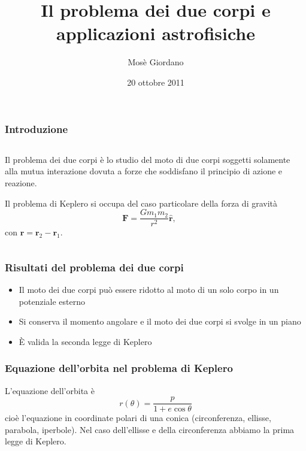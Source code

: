 \documentclass[10pt]{beamer}
\author{Mosè Giordano}
\title{Il problema dei due corpi e applicazioni astrofisiche}
\institute[UniSalento]{Università del Salento}
\date{20 ottobre 2011}
\newcommand*{\versor}[1]{\hat{\bm{#1}}}
\begin{document}
\titlepageframe{}

\begin{frame}
  \frametitle{Introduzione}
  \begin{columns}
    \begin{column}{0.5\columnwidth}
      Il \alert{problema dei due corpi} è lo studio del moto di due corpi
      soggetti solamente alla mutua interazione dovuta a forze che soddisfano il
      principio di azione e reazione.

      Il \alert{problema di Keplero} si occupa del caso particolare della forza
      di gravità
      \begin{equation*}
        \bm{F} = \frac{Gm_{1} m_{2}}{r^{2}}\versor{r},
      \end{equation*}
      con $\bm{r} = \bm{r}_{2} - \bm{r}_{1}.$
    \end{column}
    \begin{column}{0.4\columnwidth}
      \begin{tikzpicture}[tdplot_main_coords,scale=3,font=\footnotesize]
        
      \end{tikzpicture}
    \end{column}
  \end{columns}
\end{frame}

\begin{frame}
  \frametitle{Risultati del problema dei due corpi}
  \begin{itemize}[<+->]
  \item Il moto dei due corpi può essere ridotto al
    \alert{moto di un solo corpo} in un potenziale esterno
  \item Si \alert{conserva il momento angolare} e il moto dei due corpi si
    svolge in un \alert{piano} \\
    \centering
    \begin{tikzpicture}[tdplot_main_coords,scale=2.5,font=\scriptsize]
      
    \end{tikzpicture}
  \item È valida la \alert{seconda legge di Keplero}
  \end{itemize}
\end{frame}

\begin{frame}
  \frametitle{Equazione dell'orbita nel problema di Keplero}
  L'equazione dell'orbita è
  \begin{equation*}
    r(\theta) = \frac{p}{1 + e \cos\theta}
  \end{equation*}
cioè l'equazione in coordinate polari di una conica (circonferenza, ellisse,
parabola, iperbole). Nel caso dell'ellisse e della circonferenza abbiamo la
\alert{prima legge di Keplero}.
\end{frame}
\end{document}
